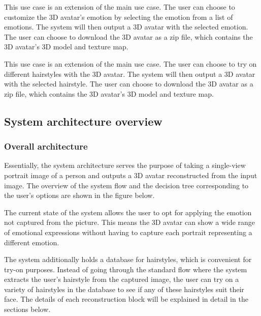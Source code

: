
This use case is an extension of the main use case. The user can choose to customize the 3D avatar's emotion by selecting the emotion from a list of emotions. The system will then output a 3D avatar with the selected emotion. The user can choose to download the 3D avatar as a zip file, which contains the 3D avatar's 3D model and texture map.


This use case is an extension of the main use case. The user can choose to try on different hairstyles with the 3D avatar. The system will then output a 3D avatar with the selected hairstyle. The user can choose to download the 3D avatar as a zip file, which contains the 3D avatar's 3D model and texture map.


\subsection{System architecture overview}

\subsubsection{Overall architecture}

Essentially, the system architecture serves the purpose of taking a single-view portrait image of a person and outputs a 3D avatar reconstructed from the input image. The overview of the system flow and the decision tree corresponding to the user's options are shown in the figure below.


The current state of the system allows the user to opt for applying the emotion not captured from the picture. This means the 3D avatar can show a wide range of emotional expressions without having to capture each portrait representing a different emotion.

The system additionally holds a database for hairstyles, which is convenient for try-on purposes. Instead of going through the standard flow where the system extracts the user's hairstyle from the captured image, the user can try on a variety of hairstyles in the database to see if any of these hairstyles suit their face. The details of each reconstruction block will be explained in detail in the sections below.

